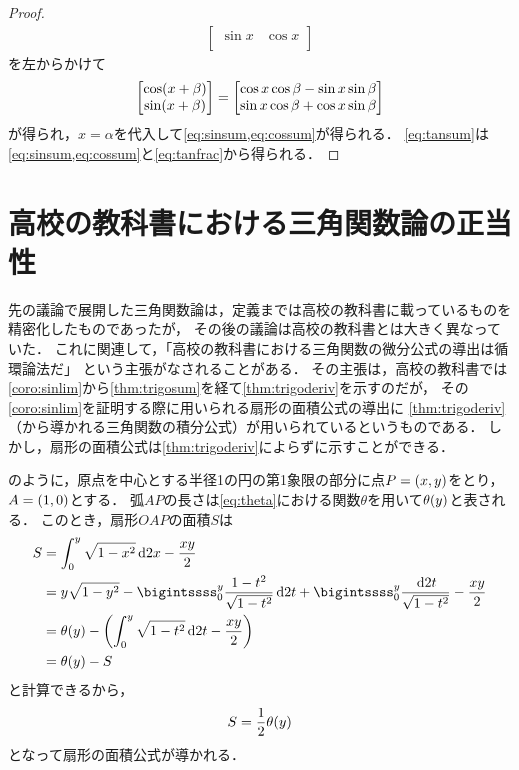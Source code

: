 \documentclass[11pt,a4paper]{ltjsarticle}
\newcommand*{\coord}[1]{\paren{#1}}
\newcommand*{\intd}{\dl2}
\theoremstyle{definition}
\begin{document}
\begin{proof}
\begin{align*}
\begin{bmatrix}
      \sin x & \cos x \\
    \end{bmatrix}
  \end{align*}
  を左からかけて
  \begin{align}
    \begin{bmatrix}
      \apply{\cos}{x + \beta} \\
      \apply{\sin}{x + \beta} \\
    \end{bmatrix}
    =
    \begin{bmatrix}
      \cos x \cos \beta - \sin x \sin \beta \\
      \sin x \cos \beta + \cos x \sin \beta \\
    \end{bmatrix}
    \label{eq:trigosumx}
  \end{align}
  が得られ，$x = \alpha$を代入して\cref{eq:sinsum,eq:cossum}が得られる．
  \cref{eq:tansum}は\cref{eq:sinsum,eq:cossum}と\cref{eq:tanfrac}から得られる．
\end{proof}

\section{高校の教科書における三角関数論の正当性} \label{sec:highschool}

先の議論で展開した三角関数論は，定義までは高校の教科書に載っているものを精密化したものであったが，
その後の議論は高校の教科書とは大きく異なっていた．
これに関連して，「高校の教科書における三角関数の微分公式の導出は循環論法だ」
という主張がなされることがある．
その主張は，高校の教科書では\cref{coro:sinlim}から\cref{thm:trigosum}を経て\cref{thm:trigoderiv}を示すのだが，
その\cref{coro:sinlim}を証明する際に用いられる扇形の面積公式の導出に
\cref{thm:trigoderiv}（から導かれる三角関数の積分公式）が用いられているというものである．
しかし，扇形の面積公式は\cref{thm:trigoderiv}によらずに示すことができる．

のように，原点を中心とする半径1の円の第1象限の部分に点$P = \coord{x,y}$をとり，
$A = \coord{1,0}$とする．
弧$AP$の長さは\cref{eq:theta}における関数$\theta$を用いて$\apply{\theta}{y}$と表される．
このとき，扇形$OAP$の面積$S$は
\begin{align*}
  S & = \int_0^y \sqrt{1 - x^2} \intd x - \frac{xy}{2} \\
  & = y \sqrt{1 - y^2} - \bigintssss_0^y \frac{1 - t^2}{\sqrt{1 - t^2}} \intd t + \bigintssss_0^y \frac{\intd t}{\sqrt{1 - t^2}} - \frac{xy}{2} \\
  & = \apply{\theta}{y} - \paren{ \int_0^y \sqrt{1 - t^2} \intd t - \frac{xy}{2}} \\
  & = \apply{\theta}{y} - S
\end{align*}
と計算できるから，
\begin{align}
  S = \frac{1}{2} \apply{\theta}{y}
\end{align}
となって扇形の面積公式が導かれる．
\end{document}
